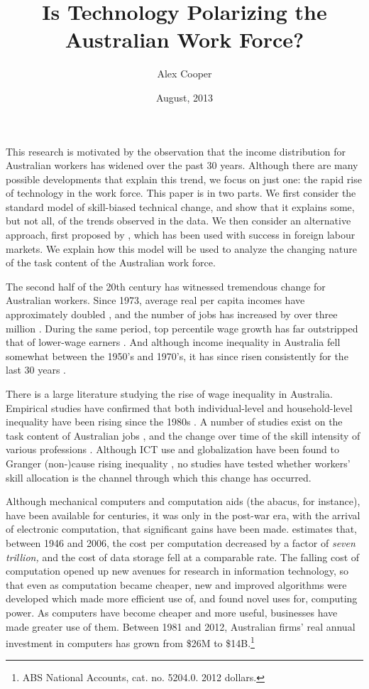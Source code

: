 \documentclass[a4paper,11pt]{article}
\title{Is Technology Polarizing the Australian Work Force?}
\author{Alex Cooper}
\date{August, 2013}
\begin{document}
\maketitle

This research is motivated by the observation that the income distribution for Australian workers has widened over the past 30 years. Although there are many possible developments that explain this trend, we focus on just one: the rapid rise of technology in the work force. This paper is in two parts. We first consider the standard model of skill-biased technical change, and show that it explains some, but not all, of the trends observed in the data. We then consider an alternative approach, first proposed by \citet{Levy2003}, which has been used with success in foreign labour markets. We explain how this model will be used to analyze the changing nature of the task content of the Australian work force.

The second half of the 20th century has witnessed tremendous change for Australian workers. Since 1973, average real per capita incomes have approximately doubled \citep{NA20124}, and the number of jobs has increased by over three million \citep{LFSApr2013}. During the same period, top percentile wage growth has far outstripped that of lower-wage earners \citep{Atkinson1997,Borland1999}. And although income inequality in Australia fell somewhat between the 1950's and 1970's, it has since risen consistently for the last 30 years \citep{Leigh2005,Gaston2009}.

There is a large literature studying the rise of wage inequality in Australia. Empirical studies have confirmed that both individual-level and household-level inequality have been rising since the 1980s \citep{Borland1999,Leigh2005,Gaston2009}. A number of studies exist on the task content of Australian jobs \citep{Esposto2012a}, and the change over time of the skill intensity of various professions \citep{Esposto2012, Esposto2012a}. Although ICT use and globalization have been found to Granger (non-)cause rising inequality \citep{Gaston2009}, no studies have tested whether workers' skill allocation is the channel through which this change has occurred.

Although mechanical computers and computation aids (the abacus, for instance), have been available for centuries, it was only in the post-war era, with the arrival of electronic computation, that significant gains have been made. \citet{Nordhaus2007} estimates that, between 1946 and 2006, the cost per computation decreased by a factor of {\em seven trillion,} and the cost of data storage fell at a comparable rate. The falling cost of computation opened up new avenues for research in information technology, so that even as computation became cheaper, new and improved algorithms were developed which made more efficient use of, and found novel uses for, computing power. As computers have become cheaper and more useful, businesses have made greater use of them. Between 1981 and 2012, Australian firms' real annual investment in computers has grown from \$26M to \$14B.\footnote{ABS National Accounts, cat. no. 5204.0. 2012 dollars.}
\end{document}
